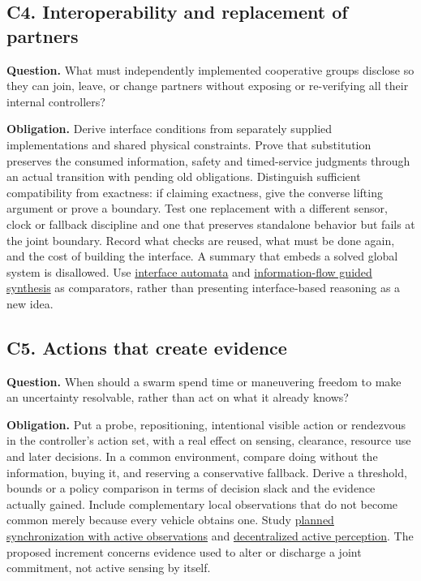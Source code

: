 \documentclass[11pt]{article}
\begin{document}
\subsection{C4. Interoperability and replacement of partners}
\textbf{Question.} What must independently implemented cooperative groups disclose so they can join, leave, or change partners without exposing or re-verifying all their internal controllers?

\textbf{Obligation.} Derive interface conditions from separately supplied implementations and shared physical constraints. Prove that substitution preserves the consumed information, safety and timed-service judgments through an actual transition with pending old obligations. Distinguish sufficient compatibility from exactness: if claiming exactness, give the converse lifting argument or prove a boundary. Test one replacement with a different sensor, clock or fallback discipline and one that preserves standalone behavior but fails at the joint boundary. Record what checks are reused, what must be done again, and the cost of building the interface. A summary that embeds a solved global system is disallowed. Use \href{https://web.cs.wpi.edu/~heineman/html/teaching_/CS562/p109-de_alfaro.pdf}{interface automata} and \href{https://arxiv.org/abs/2205.12085}{information-flow guided synthesis} as comparators, rather than presenting interface-based reasoning as a new idea.

\subsection{C5. Actions that create evidence}
\textbf{Question.} When should a swarm spend time or maneuvering freedom to make an uncertainty resolvable, rather than act on what it already knows?

\textbf{Obligation.} Put a probe, repositioning, intentional visible action or rendezvous in the controller's action set, with a real effect on sensing, clearance, resource use and later decisions. In a common environment, compare doing without the information, buying it, and reserving a conservative fallback. Derive a threshold, bounds or a policy comparison in terms of decision slack and the evidence actually gained. Include complementary local observations that do not become common merely because every vehicle obtains one. Study \href{https://pmc.ncbi.nlm.nih.gov/articles/PMC12738390/}{planned synchronization with active observations} and \href{https://papers.neurips.cc/paper_files/paper/2020/hash/9db6faeef387dc789777227a8bed4d52-Abstract.html}{decentralized active perception}. The proposed increment concerns evidence used to alter or discharge a joint commitment, not active sensing by itself.
\end{document}

